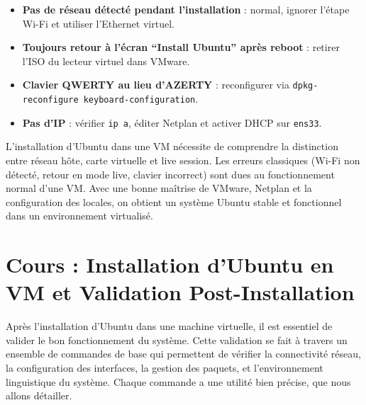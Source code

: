\documentclass[11pt,a4paper]{article}
\begin{document}
\begin{tcolorbox}[title={7. Problèmes fréquents et solutions}]
\begin{itemize}
  \item \textbf{Pas de réseau détecté pendant l’installation} : normal, ignorer l’étape Wi-Fi et utiliser l’Ethernet virtuel.  
  \item \textbf{Toujours retour à l’écran “Install Ubuntu” après reboot} : retirer l’ISO du lecteur virtuel dans VMware.  
  \item \textbf{Clavier QWERTY au lieu d’AZERTY} : reconfigurer via \texttt{dpkg-reconfigure keyboard-configuration}.  
  \item \textbf{Pas d’IP} : vérifier \texttt{ip a}, éditer Netplan et activer DHCP sur \texttt{ens33}.
\end{itemize}
\end{tcolorbox}

\begin{tcolorbox}[title={Conclusion}]
L’installation d’Ubuntu dans une VM nécessite de comprendre la distinction entre réseau hôte, carte virtuelle et live session. Les erreurs classiques (Wi-Fi non détecté, retour en mode live, clavier incorrect) sont dues au fonctionnement normal d’une VM. Avec une bonne maîtrise de VMware, Netplan et la configuration des locales, on obtient un système Ubuntu stable et fonctionnel dans un environnement virtualisé.
\end{tcolorbox}


\section{Cours : Installation d’Ubuntu en VM et Validation Post-Installation}


\begin{tcolorbox}[title={Introduction}]
Après l’installation d’Ubuntu dans une machine virtuelle, il est essentiel de valider le bon fonctionnement du système.  
Cette validation se fait à travers un ensemble de commandes de base qui permettent de vérifier la connectivité réseau, la configuration des interfaces, la gestion des paquets, et l’environnement linguistique du système.  
Chaque commande a une utilité bien précise, que nous allons détailler.
\end{tcolorbox}
\end{document}
